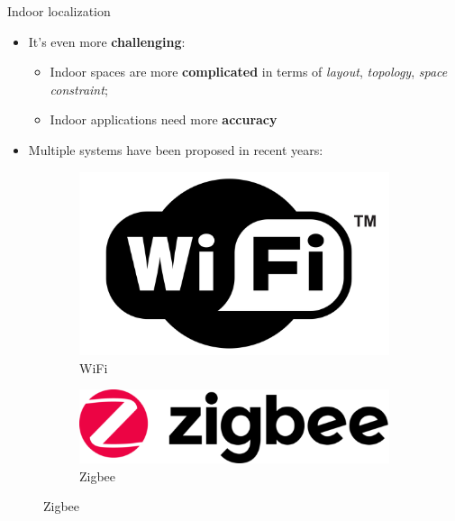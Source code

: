 \begin{frame}{Indoor localization}
    \begin{itemize}[<+->]
        \item It's even more \textbf{challenging}:
            \begin{itemize}
                \item Indoor spaces are more \textbf{complicated} in terms of \textit{layout}, \textit{topology}, \textit{space constraint};
                \item Indoor applications need more \textbf{accuracy}
            \end{itemize}
        \item Multiple systems have been proposed in recent years:
        \end{itemize}
        \pause
        \begin{figure}[!htb]
            \centering
            \begin{subfigure}[t]{0.24\textwidth}
                \centering
                \includegraphics[width=\linewidth]{images/wifi.png}
                \caption{WiFi}
                \label{fig:wifi}
            \end{subfigure}
            \hfill
            \begin{subfigure}[t]{0.24\textwidth}
                \centering
                \includegraphics[width=\linewidth]{images/zigbee.png}
                \caption{Zigbee}
                \label{fig:zigbee}

\end{subfigure}
\end{figure}
\end{frame}
